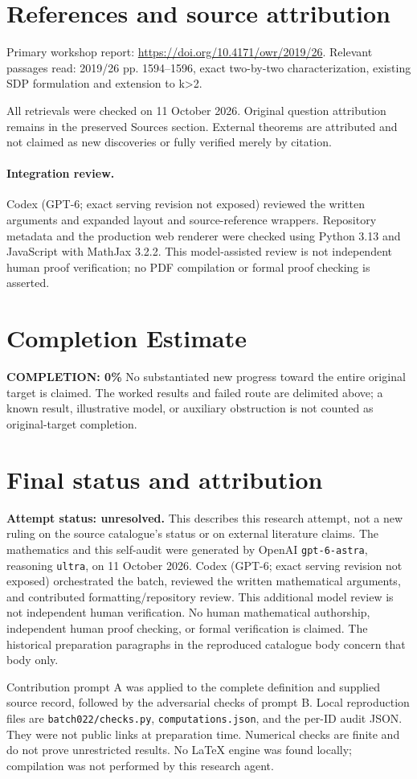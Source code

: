 \documentclass[11pt]{article}
\begin{document}
\section{References and source attribution}
Primary workshop report: \url{https://doi.org/10.4171/owr/2019/26}. Relevant passages read: 2019/26 pp. 1594--1596, exact two-by-two characterization, existing SDP formulation and extension to k>2.

All retrievals were checked on 11 October 2026. Original question attribution remains in the preserved Sources section. External theorems are attributed and not claimed as new discoveries or fully verified merely by citation.


\paragraph{Integration review.} Codex (GPT-6; exact serving revision not exposed) reviewed the written arguments and expanded layout and source-reference wrappers. Repository metadata and the production web renderer were checked using Python 3.13 and JavaScript with MathJax 3.2.2. This model-assisted review is not independent human proof verification; no PDF compilation or formal proof checking is asserted.

\section{Completion Estimate}
\noindent\textbf{COMPLETION: 0\%}
No substantiated new progress toward the entire original target is claimed. The worked results and failed route are delimited above; a known result, illustrative model, or auxiliary obstruction is not counted as original-target completion.

\section{Final status and attribution}
\textbf{Attempt status: unresolved.} This describes this research attempt, not a new ruling on the source catalogue's status or on external literature claims.
The mathematics and this self-audit were generated by OpenAI \texttt{gpt-6-astra}, reasoning \texttt{ultra}, on 11 October 2026. Codex (GPT-6; exact serving revision not exposed) orchestrated the batch, reviewed the written mathematical arguments, and contributed formatting/repository review. This additional model review is not independent human verification. No human mathematical authorship, independent human proof checking, or formal verification is claimed. The historical preparation paragraphs in the reproduced catalogue body concern that body only.

Contribution prompt A was applied to the complete definition and supplied source record, followed by the adversarial checks of prompt B. Local reproduction files are \texttt{batch022/checks.py}, \texttt{computations.json}, and the per-ID audit JSON. They were not public links at preparation time. Numerical checks are finite and do not prove unrestricted results. No LaTeX engine was found locally; compilation was not performed by this research agent.
\end{document}
